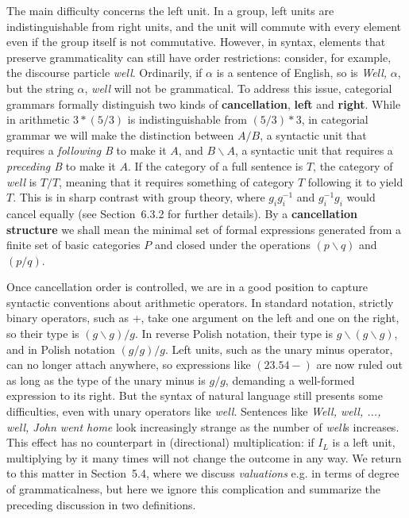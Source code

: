 The main difficulty concerns the left unit. In a group, left units are
indistinguishable from right units, and the unit will commute with every
element even if the group itself is not commutative. However, in syntax,
elements that preserve grammaticality can still have order restrictions:
consider, for example, the discourse particle {\it well}.  Ordinarily, if
$\alpha$ is a sentence of English, so is {\it Well,} $\alpha$, but the string
$\alpha$, {\it well} will not be grammatical. To address this issue,
categorial grammars formally distinguish two kinds of {\bf cancellation}, {\bf
  left} and {\bf right}. While in arithmetic $3*(5/3)$ is indistinguishable
from $(5/3)*3$, in categorial grammar we will make the distinction between
$A/B$, a syntactic unit that requires a {\it following B} to make it $A$, and
$B \backslash A$, a syntactic unit that requires a {\it preceding B} to make
it $A$. If the category of a full sentence is $T$, the category of {\it well}
is $T/T$, meaning that it requires something of category $T$ following it to
yield $T$. This is in sharp contrast with group theory, where $g_ig_i^{-1}$
and $g_i^{-1}g_i$ would cancel equally (see Section~6.3.2 for further
details).  By a {\bf cancellation structure} we shall mean the minimal set of
formal expressions generated from a finite set of basic categories $P$ and
closed under the operations $(p \backslash q)$ and
$(p/q)$.

Once cancellation order is controlled, we are in a good position to capture
syntactic conventions about arithmetic operators. In standard notation,
strictly binary operators, such as +, take one argument on the left and one on
the right, so their type is $(g \backslash g)/g$. In reverse Polish notation,
their type is $g \backslash (g \backslash g)$, and in Polish notation
$(g/g)/g$.  Left units, such as the unary minus operator, can no longer attach
anywhere, so expressions like $(23.54-)$ are now ruled out as long as the type
of the unary minus is $g/g$, demanding a well-formed expression to its right.
But the syntax of natural language still presents some difficulties, even with
unary operators like {\it well}. Sentences like {\it Well, well, ..., well,
  John went home} look increasingly strange as the number of {\it well}s
increases.  This effect has no counterpart in (directional) multiplication: if
$I_L$ is a left unit, multiplying by it many times will not change the outcome
in any way. We return to this matter in Section~5.4, where we discuss {\it
  valuations} e.g.  in terms of degree of grammaticalness, but here we ignore
this complication and summarize the preceding discussion in two definitions.

